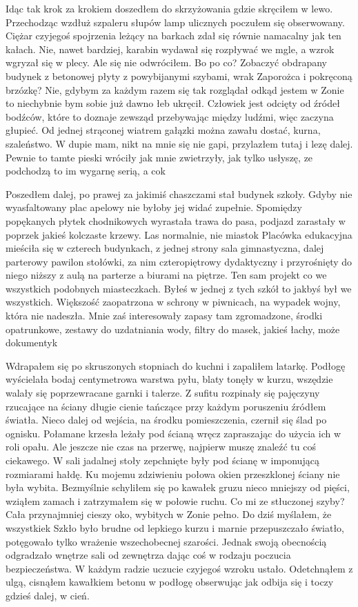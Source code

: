 \documentclass[../MAIN.tex]{subfiles}
\begin{document}
Idąc tak krok za krokiem doszedłem do skrzyżowania gdzie skręciłem w lewo. Przechodząc wzdłuż szpaleru słupów lamp ulicznych poczułem się obserwowany. Ciężar czyjegoś spojrzenia leżący na barkach zdał się równie namacalny jak ten kałach. Nie, nawet bardziej, karabin wydawał się rozpływać we mgle, a wzrok wgryzał się w plecy. Ale się nie odwróciłem. Bo po co? Zobaczyć obdrapany budynek z betonowej płyty z powybijanymi szybami, wrak Zaporożca i pokręconą brzózkę? Nie, gdybym za każdym razem się tak rozglądał odkąd jestem w Zonie to niechybnie bym sobie już dawno łeb ukręcił. Człowiek jest odcięty od źródeł bodźców, które to doznaje zewsząd przebywając między ludźmi, więc zaczyna głupieć. Od jednej strąconej wiatrem gałązki można zawału dostać, kurna, szaleństwo. W dupie mam, nikt na mnie się nie gapi, przylazłem tutaj i lezę dalej. Pewnie to tamte pieski wróciły jak mnie zwietrzyły, jak tylko usłyszę, ze podchodzą to im wygarnę serią, a co\3k

Poszedłem dalej, po prawej za jakimiś chaszczami stał budynek szkoły. Gdyby nie wyasfaltowany plac apelowy nie byłoby jej widać zupełnie. Spomiędzy popękanych płytek chodnikowych wyrastała trawa do pasa, podjazd zarastały w poprzek jakieś kolczaste krzewy. Las normalnie, nie miasto\3k Placówka edukacyjna mieściła się w czterech budynkach, z jednej strony sala gimnastyczna, dalej parterowy pawilon stołówki, za nim czteropiętrowy dydaktyczny i przyrośnięty do niego niższy z aulą na parterze a biurami na piętrze. Ten sam projekt co we wszystkich podobnych miasteczkach. Byłeś w jednej z tych szkół to jakbyś był we wszystkich. Większość zaopatrzona w schrony w piwnicach, na wypadek wojny, która nie nadeszła. Mnie zaś interesowały zapasy tam zgromadzone, środki opatrunkowe, zestawy do uzdatniania wody, filtry do masek, jakieś łachy, może dokumenty\3k

Wdrapałem się po skruszonych stopniach do kuchni i zapaliłem latarkę. Podłogę wyścielała bodaj centymetrowa warstwa pyłu, blaty tonęły w kurzu, wszędzie walały się poprzewracane garnki i talerze. Z sufitu rozpinały się pajęczyny rzucające na ściany długie cienie tańczące przy każdym poruszeniu źródłem światła. Nieco dalej od wejścia, na środku pomieszczenia, czernił się ślad po ognisku. Połamane krzesła leżały pod ścianą wręcz zapraszając do użycia ich w roli opału. Ale jeszcze nie czas na przerwę, najpierw muszę znaleźć tu coś ciekawego. W sali jadalnej stoły zepchnięte były pod ścianę w imponującą rozmiarami hałdę. Ku mojemu zdziwieniu połowa okien przeszklonej ściany nie była wybita. Bezmyślnie schyliłem się po kawałek gruzu nieco mniejszy od pięści, wziąłem zamach i zatrzymałem się w połowie ruchu. Co mi ze stłuczonej szyby? Cała przynajmniej cieszy oko, wybitych w Zonie pełno. Do dziś myślałem, że wszystkie\3k Szkło było brudne od lepkiego kurzu i marnie przepuszczało światło, potęgowało tylko wrażenie 
wszechobecnej szarości. Jednak swoją obecnością odgradzało wnętrze sali od zewnętrza dając coś w rodzaju poczucia bezpieczeństwa. W każdym radzie uczucie czyjegoś wzroku ustało. Odetchnąłem z ulgą, cisnąłem kawałkiem betonu w podłogę obserwując jak odbija się i toczy gdzieś dalej, w cień.
\end{document}
